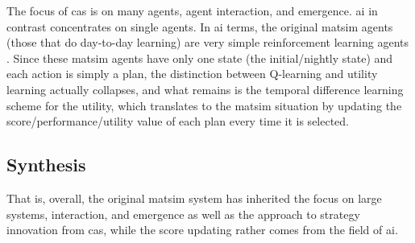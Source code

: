 The focus of \gls{cas} is on many agents, agent interaction, and emergence. \Acrfull{ai} in contrast concentrates on single agents. In \gls{ai} terms, the original \gls{matsim} agents (those that do day-to-day learning) are very simple 
reinforcement learning agents \citep[][Chapter 21.3]{RusselNorvig2010ArtificialIntelligence}. Since these \gls{matsim} agents have only one state (the initial/nightly state) and each action is simply a plan, the distinction between Q-learning and utility learning \citep[as defined by][]{RusselNorvig2010ArtificialIntelligence} actually collapses, and what remains is the temporal difference 
learning \citep[again as defined by][]{RusselNorvig2010ArtificialIntelligence} scheme for the utility, which translates to the \gls{matsim} situation by updating the score/performance/utility value of each plan every time it is selected.



\subsection{Synthesis}

That is, overall,
the original \gls{matsim} system has inherited the focus on large systems, interaction, and emergence as well as the approach to strategy innovation from \gls{cas}, while the score updating rather comes from the field of \gls{ai}.

